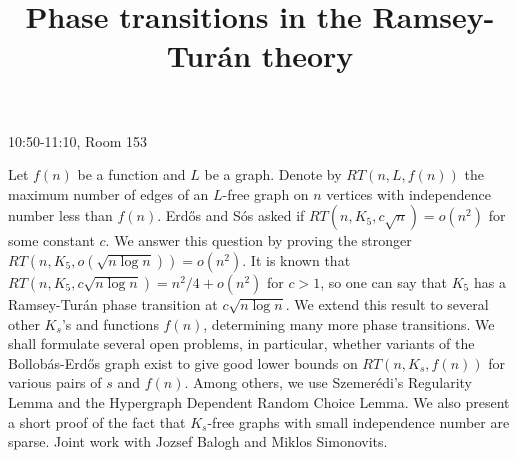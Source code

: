 \documentclass{article}
\begin{document}
\newpage

\begin{LARGE}10:50-11:10, Room 153\end{LARGE}

\vspace{.5in}

\title{ Phase transitions in the Ramsey-Tur\'an theory}
\endtitle
 Let $f(n)$ be a function and $L$ be a graph.  Denote by
$RT(n,L,f(n))$ the maximum number of edges of an $L$-free graph on
$n$ vertices with independence number less than $f(n)$.  Erd\H os and
S\'os asked if $RT\left(n, K_5, c\sqrt{n}\right) = o(n^2)$
for some constant $c$.  We answer this question by proving
the stronger $RT\left(n, K_5, o\left(\sqrt{n\log n}\right)\right) = o(n^2)$. It is known that
$RT \left(n, K_5, c \sqrt{n\log n} \right) = n^2/4+o(n^2)$ for $c>1$,
so one can say that $K_5$ has a Ramsey-Tur\'an
phase transition at $c\sqrt{n\log n}$.  We extend this result
to several other $K_s$'s and functions $f(n)$,
determining many more phase transitions.  We shall
formulate several open problems, in particular, whether variants of
the Bollob\'as-Erd\H os graph exist to give good lower bounds on
$RT\left(n, K_s, f(n)\right)$ for various pairs of $s$ and
$f(n)$. Among others, we use Szemer\'edi's Regularity Lemma and the
Hypergraph Dependent Random Choice Lemma. We also present a short
proof of the fact that $K_s$-free graphs with small independence
number are sparse.
Joint work with Jozsef Balogh and Miklos Simonovits.
\end{document}

